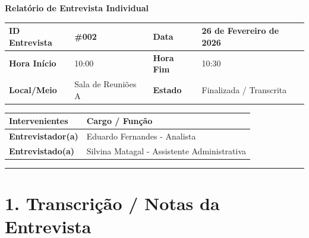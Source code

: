 \documentclass[11pt,a4paper]{article}
\begin{document}
	
	{\noindent\LARGE\bfseries\color{primaryblue} Relatório de Entrevista Individual}
	\\[0.5cm]
	
	\renewcommand{\arraystretch}{1.5}
	\begin{tabularx}{\textwidth}{@{}|l|X|l|X|@{}}
		\hline
		\rowcolor{gray!10} \textbf{ID Entrevista} & \#002 & \textbf{Data} & 26 de Fevereiro de 2026 \\ \hline
		\textbf{Hora Início} & 10:00 & \textbf{Hora Fim} & 10:30 \\ \hline
		\textbf{Local/Meio} & Sala de Reuniões A & \textbf{Estado} & Finalizada / Transcrita \\ \hline
	\end{tabularx}
	
	\vspace{0.5cm}
	
	\begin{tabularx}{\textwidth}{@{}|l|X|@{}}
		\hline
		\rowcolor{gray!10} \textbf{Intervenientes} & \textbf{Cargo / Função} \\ \hline
		\textbf{Entrevistador(a)} & Eduardo Fernandes - Analista\\ \hline
		\textbf{Entrevistado(a)}  & Silvina Matagal - Assistente Administrativa \\ \hline
	\end{tabularx}
	
	\vspace{0.8cm}
	
	\hrule %
	\vspace{0.2cm}
	
	\section*{1. Transcrição / Notas da Entrevista}
	
\end{document}
